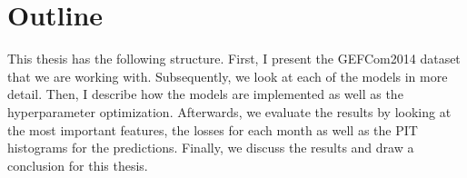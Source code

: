 \section{Outline}
\label{sec:outline}

This thesis has the following structure. 
First, I present the GEFCom2014 dataset that we are working with. 
Subsequently, we look at each of the models in more detail. 
Then, I describe how the models are implemented as well as 
the hyperparameter optimization.
Afterwards, we evaluate the results by looking at the 
most important features, the losses for each month as well as 
the PIT histograms for the predictions. 
Finally, we discuss the results and draw a conclusion for this thesis.